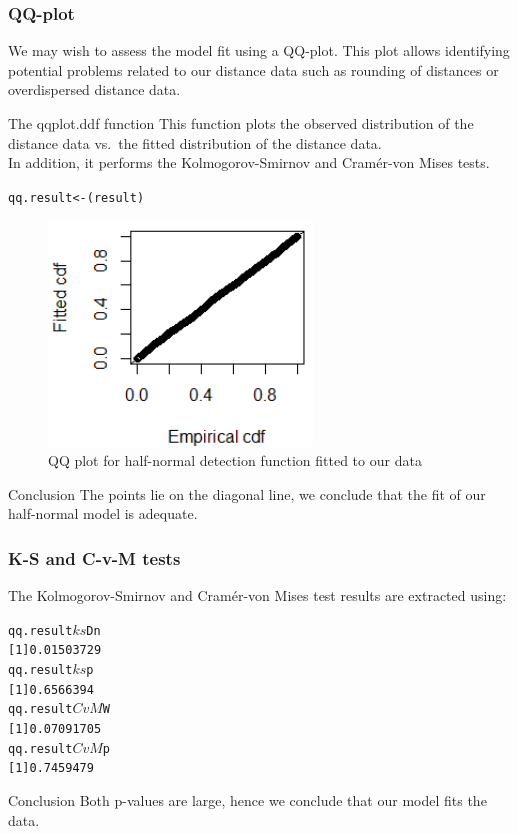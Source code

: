 \frametitle{QQ-plot}
\noindent We may wish to assess the model fit using a QQ-plot. This plot allows identifying potential problems related to our distance data such as rounding of distances or overdispersed distance data. 
\begin{block}{The qqplot.ddf function}
This function plots the observed distribution of the distance data vs.\ the fitted distribution of the distance data. \\
In addition, it performs the Kolmogorov-Smirnov and Cram\'{e}r-von Mises tests. 
\end{block}
\begin{knitrout}\footnotesize
{}\color{fgcolor}
\begin{kframe}\begin{alltt}
qq.result <- (result)
\end{alltt}\end{kframe}\end{knitrout}
\begin{figure}[ht]
  \centering
  \includegraphics[width=7cm]{qqresult.png}
\caption{QQ plot for half-normal detection function fitted to our data}
\label{fig:QQ_HN_all}
\end{figure}
\begin{block}{Conclusion}
The points lie on the diagonal line, we conclude that the fit of our half-normal model is adequate. 
\end{block}

\frametitle{K-S and C-v-M tests}
\noindent The Kolmogorov-Smirnov and Cram\'{e}r-von Mises test results are extracted using:
\begin{knitrout}\footnotesize
{}\color{fgcolor}
\begin{kframe}
\begin{alltt}
qq.result$ks$Dn
[1] 0.01503729
qq.result$ks$p
[1] 0.6566394
qq.result$CvM$W
[1] 0.07091705
qq.result$CvM$p
[1] 0.7459479
\end{alltt}
\end{kframe}
\end{knitrout}
\begin{block}{Conclusion}
Both p-values are large, hence we conclude that our model fits the data. 
\end{block}

